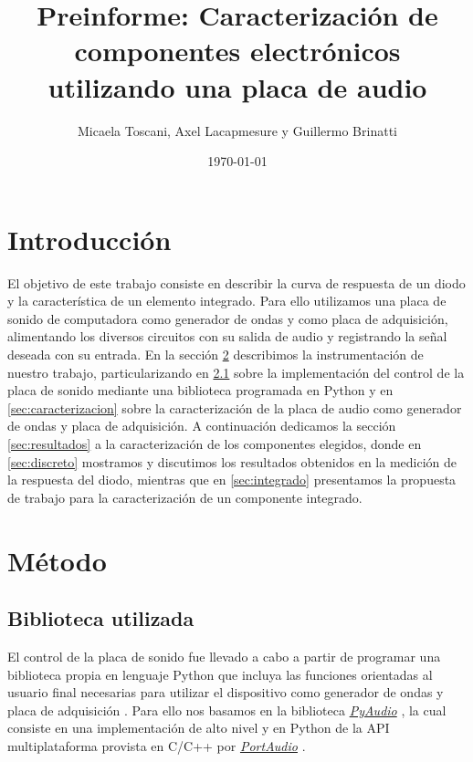 \documentclass[a4paper,11pt]{article}
\title{Preinforme: Caracterización de componentes electrónicos utilizando una placa de audio}
\date{\today}
\author{Micaela Toscani, Axel Lacapmesure y Guillermo Brinatti}
\begin{document}
\maketitle

\section{Introducción}

El objetivo de este trabajo consiste en describir la curva de respuesta de un diodo y la característica de un elemento integrado. Para ello utilizamos una placa de sonido de computadora como generador de ondas y como placa de adquisición, alimentando los diversos circuitos con su salida de audio y registrando la señal deseada con su entrada. En la sección \ref{sec:metodo} describimos la instrumentación de nuestro trabajo, particularizando en \ref{sec:biblioteca} sobre la implementación del control de la placa de sonido mediante una biblioteca programada en Python y en \ref{sec:caracterizacion} sobre la caracterización de la placa de audio como generador de ondas y placa de adquisición. A continuación dedicamos la sección \ref{sec:resultados} a la caracterización de los componentes elegidos, donde en \ref{sec:discreto} mostramos y discutimos los resultados obtenidos en la medición de la respuesta del diodo, mientras que en \ref{sec:integrado} presentamos la propuesta de trabajo para la caracterización de un componente integrado.

\section{Método}
\label{sec:metodo}

	\subsection{Biblioteca utilizada}
	\label{sec:biblioteca}
	
	El control de la placa de sonido fue llevado a cabo a partir de programar una biblioteca propia en lenguaje Python que incluya las funciones orientadas al usuario final necesarias para utilizar el dispositivo como generador de ondas y placa de adquisición \cite{repo}. Para ello nos basamos en la biblioteca \emph{\href{https://people.csail.mit.edu/hubert/pyaudio/}{PyAudio}} \cite{pyaudio}, la cual consiste en una implementación de alto nivel y en Python de la API multiplataforma provista en C/C++ por \emph{\href{http://www.portaudio.com/}{PortAudio}} \cite{portaudio}.
	
\end{document}
